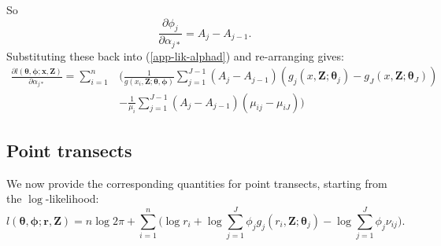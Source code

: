 \documentclass[useAMS,referee]{biom}
\begin{document}
So
\begin{equation*}
\frac{\partial \phi_j}{\partial \alpha_{j*}} = A_j - A_{j-1}.
\end{equation*}
Substituting these back into (\ref{app-lik-alphad}) and re-arranging gives:
\begin{align*}
\frac{\partial l(\bm{\theta},\bm{\phi}; \mathbf{x},\mathbf{Z})}{\partial \alpha_{j*}} = \sum_{i=1}^n & \Big( \frac{1}{g(x_i,\mathbf{Z}; \bm{\theta},\bm{\phi})} \sum_{j=1}^{J-1} (A_j - A_{j-1}) (g_j(x,\mathbf{Z}; \bm{\theta}_j) - g_J(x,\mathbf{Z}; \bm{\theta}_J))\\
&- \frac{1}{\mu_i} \sum_{j=1}^{J-1}(A_j - A_{j-1})(\mu_{ij} - \mu_{iJ}) \Big)
\end{align*}

\subsection*{Point transects}

We now provide the corresponding quantities for point transects, starting from the $\log$-likelihood:
\begin{equation}
l(\bm{\theta}, \bm{\phi}; \mathbf{r},\mathbf{Z}) = n \log 2 \pi + \sum_{i=1}^n \Big( \log r_i + \log \sum_{j=1}^J \phi_j g_j(r_i,\mathbf{Z}; \bm{\theta}_j) - \log \sum_{j=1}^J \phi_j \nu_{ij}\Big).
\label{pt-lik}
\end{equation}
\end{document}
